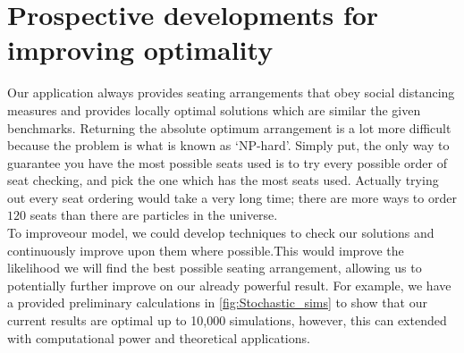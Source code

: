 \documentclass[11pt,a4paper]{article}
\begin{document}
\section*{Prospective developments for improving optimality}
Our application always provides seating arrangements that obey social distancing measures and provides locally optimal solutions which are similar the given benchmarks. Returning the  absolute optimum arrangement  is a lot more difficult because the problem is what is known as `NP-hard'.  Simply put, the only way to guarantee you have the most possible seats used is to try every possible order of seat checking, and pick the one which has the most seats used. Actually trying out every seat ordering would take a very long time; there are more ways to order $120$ seats than there are particles in the universe.\\

To improveour model, we could develop techniques to check our solutions and continuously improve upon them where possible.This would improve the likelihood we will find the best possible seating arrangement, allowing us to potentially further improve on our already powerful result. For example, we have a provided preliminary calculations in \autoref{fig:Stochastic_sims} to show that our current results are optimal up to 10,000 simulations, however, this can extended with computational power and theoretical applications.\\
\end{document}
